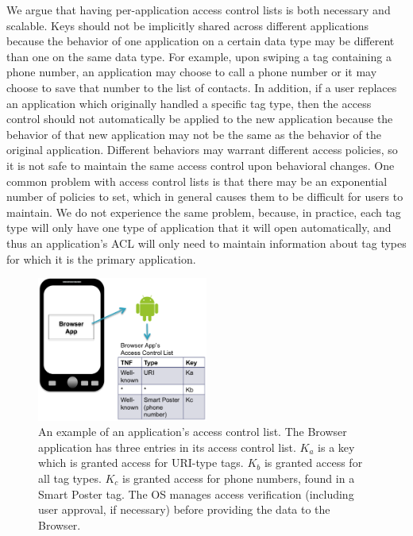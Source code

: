 \documentclass[12pt]{article}
\begin{document}
We argue that having per-application access control lists is both necessary and scalable.
Keys should not be implicitly shared across different applications because the behavior of one application on a certain data type may be different than one on the same data type.
For example, upon swiping a tag containing a phone number, an application may choose to call a phone number or it may choose to save that number to the list of contacts.
In addition, if a user replaces an application which originally handled a specific tag type, then the access control should not automatically be applied to the new application because the behavior of that new application may not be the same as the behavior of the original application.
Different behaviors may warrant different access policies, so it is not safe to maintain the same access control upon behavioral changes.
One common problem with access control lists is that there may be an exponential number of policies to set, which in general causes them to be difficult for users to maintain.
We do not experience the same problem, because, in practice, each tag type will only have one type of application that it will open automatically, and thus an application's ACL will only need to maintain information about tag types for which it is the primary application.
\begin{figure}[h!]
\begin{minipage}{\textwidth}
	\centering
		\includegraphics[width=0.5\textwidth]{ACL_image.png}
	\caption[Caption for LOF]%
    {An example of an application's access control list. The Browser application has three entries in its access control list. $K_a$ is a key which is granted access for URI-type tags. $K_b$ is granted access for all tag types. $K_c$ is granted access for phone numbers, found in a Smart Poster tag. The OS manages access verification (including user approval, if necessary) before providing the data to the Browser.}
  \label{fig:solution:acl}

\end{minipage} 
\end{figure}
\end{document}
